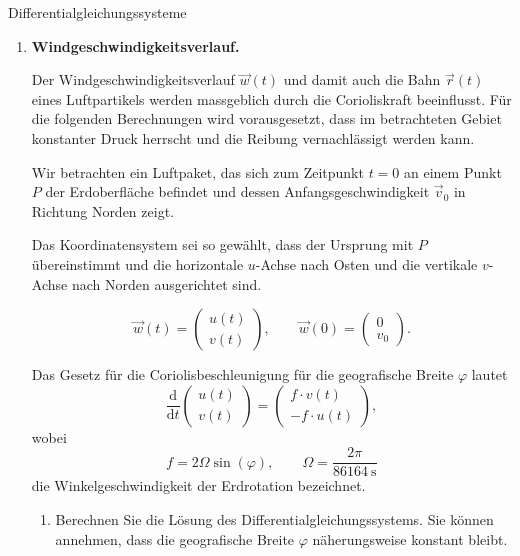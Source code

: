 \begin{ueb}{Differentialgleichungssysteme}{}
\begin{enumerate}
        \item \textbf{Windgeschwindigkeitsverlauf.}

              Der Windgeschwindigkeitsverlauf \(\vec{w}(t)\) und damit
              auch die Bahn \(\vec{r}(t)\) eines Luftpartikels werden
              massgeblich durch die Corioliskraft beeinflusst.
              Für die folgenden Berechnungen wird vorausgesetzt,
              dass im betrachteten Gebiet konstanter Druck herrscht
              und die Reibung vernachlässigt werden kann.

              Wir betrachten ein Luftpaket, das sich zum Zeitpunkt
              \(t=0\) an einem Punkt \(P\) der Erdoberfläche befindet
              und dessen Anfangsgeschwindigkeit \(\vec{v}_0\)
              in Richtung Norden zeigt.

              Das Koordinatensystem sei so gewählt, dass der Ursprung
              mit \(P\) übereinstimmt und die horizontale \(u\)-Achse
              nach Osten und die vertikale \(v\)-Achse nach Norden
              ausgerichtet sind.

              \[
                  \vec{w}(t)=
                  \begin{pmatrix}u(t)\\v(t)\end{pmatrix},
                  \qquad
                  \vec{w}(0)=
                  \begin{pmatrix}0\\v_0\end{pmatrix}.
              \]

              Das Gesetz für die Coriolisbeschleunigung für die
              geografische Breite \(\varphi\) lautet
              \[
                  \frac{\mathrm{d}}{\mathrm{d}t}
                  \begin{pmatrix}u(t)\\v(t)\end{pmatrix}
                  =
                  \begin{pmatrix}
                      f\cdot v(t) \\
                      -f\cdot u(t)
                  \end{pmatrix},
              \]
              wobei
              \[
                  f=2\Omega\sin(\varphi),
                  \qquad
                  \Omega=\frac{2\pi}{\SI{86164}{\second}}
              \]
              die Winkelgeschwindigkeit der Erdrotation bezeichnet.

              \begin{enumerate}
                  \item Berechnen Sie die Lösung des
                        Differentialgleichungssystems.
                        Sie können annehmen, dass die geografische
                        Breite \(\varphi\) näherungsweise konstant bleibt.


\end{enumerate}
\end{enumerate}
\end{ueb}
